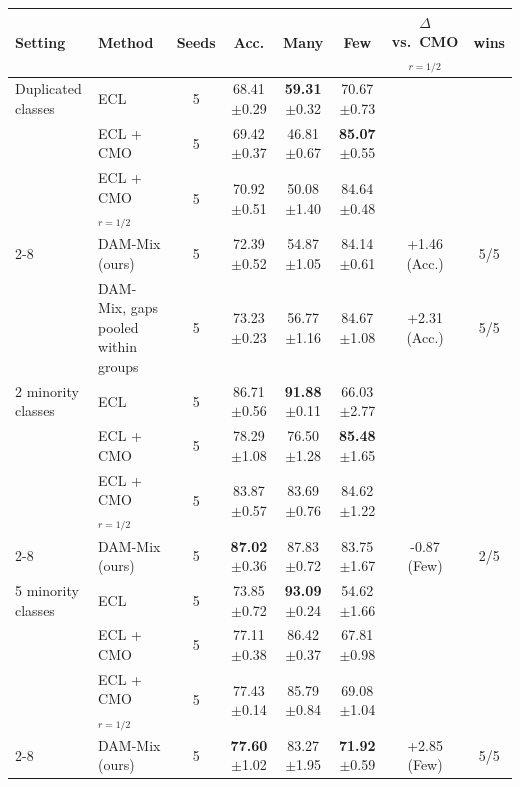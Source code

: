\begin{tabular}{ll c ccc cc}
\toprule
Setting & Method & Seeds & Acc. & Many & Few & $\Delta$ vs.\ CMO$_{r=1/2}$ & wins \\
\midrule
Duplicated classes & ECL & 5 & 68.41{\scriptsize$\pm$0.29} & \textbf{59.31}{\scriptsize$\pm$0.32} & 70.67{\scriptsize$\pm$0.73} &  &  \\
 & ECL + CMO & 5 & 69.42{\scriptsize$\pm$0.37} & 46.81{\scriptsize$\pm$0.67} & \textbf{85.07}{\scriptsize$\pm$0.55} &  &  \\
 & ECL + CMO$_{r=1/2}$ & 5 & 70.92{\scriptsize$\pm$0.51} & 50.08{\scriptsize$\pm$1.40} & 84.64{\scriptsize$\pm$0.48} &  &  \\
\cmidrule(l){2-8}
 & DAM-Mix (ours) & 5 & 72.39{\scriptsize$\pm$0.52} & 54.87{\scriptsize$\pm$1.05} & 84.14{\scriptsize$\pm$0.61} & +1.46 (Acc.) & 5/5 \\
 & DAM-Mix, gaps pooled within groups & 5 & 73.23{\scriptsize$\pm$0.23} & 56.77{\scriptsize$\pm$1.16} & 84.67{\scriptsize$\pm$1.08} & +2.31 (Acc.) & 5/5 \\
\midrule
2 minority classes & ECL & 5 & 86.71{\scriptsize$\pm$0.56} & \textbf{91.88}{\scriptsize$\pm$0.11} & 66.03{\scriptsize$\pm$2.77} &  &  \\
 & ECL + CMO & 5 & 78.29{\scriptsize$\pm$1.08} & 76.50{\scriptsize$\pm$1.28} & \textbf{85.48}{\scriptsize$\pm$1.65} &  &  \\
 & ECL + CMO$_{r=1/2}$ & 5 & 83.87{\scriptsize$\pm$0.57} & 83.69{\scriptsize$\pm$0.76} & 84.62{\scriptsize$\pm$1.22} &  &  \\
\cmidrule(l){2-8}
 & DAM-Mix (ours) & 5 & \textbf{87.02}{\scriptsize$\pm$0.36} & 87.83{\scriptsize$\pm$0.72} & 83.75{\scriptsize$\pm$1.67} & -0.87 (Few) & 2/5 \\
\midrule
5 minority classes & ECL & 5 & 73.85{\scriptsize$\pm$0.72} & \textbf{93.09}{\scriptsize$\pm$0.24} & 54.62{\scriptsize$\pm$1.66} &  &  \\
 & ECL + CMO & 5 & 77.11{\scriptsize$\pm$0.38} & 86.42{\scriptsize$\pm$0.37} & 67.81{\scriptsize$\pm$0.98} &  &  \\
 & ECL + CMO$_{r=1/2}$ & 5 & 77.43{\scriptsize$\pm$0.14} & 85.79{\scriptsize$\pm$0.84} & 69.08{\scriptsize$\pm$1.04} &  &  \\
\cmidrule(l){2-8}
 & DAM-Mix (ours) & 5 & \textbf{77.60}{\scriptsize$\pm$1.02} & 83.27{\scriptsize$\pm$1.95} & \textbf{71.92}{\scriptsize$\pm$0.59} & +2.85 (Few) & 5/5 \\
\bottomrule
\end{tabular}
